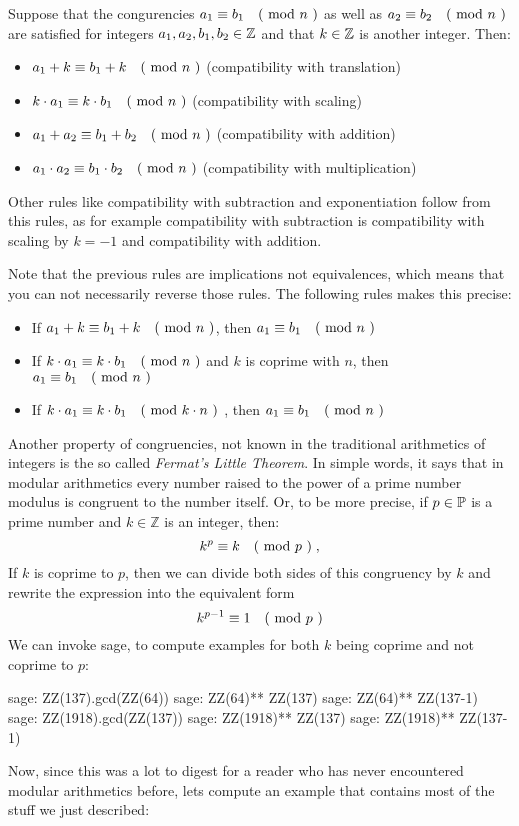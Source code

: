 Suppose that the congurencies $a_1 \equiv b_1 \quad \text{( mod } n \text{ )}$ as well as $a_2 \equiv b_2 \quad \text{( mod } n \text{ )}$ are satisfied for integers $a_1,a_2,b_1,b_2\in\mathbb{Z}$ and that $k\in\mathbb{Z}$ is another integer. Then:
\begin{itemize}
\item $a_1+k \equiv b_1+k \quad \text{( mod } n \text{ )}$ (compatibility with translation)
\item $k\cdot a_1 \equiv k\cdot b_1 \quad \text{( mod } n \text{ )}$ (compatibility with scaling)
\item $a_1+a_2 \equiv b_1+b_2 \quad \text{( mod } n \text{ )}$ (compatibility with addition)
\item $a_1\cdot a_2 \equiv b_1\cdot b_2 \quad \text{( mod } n \text{ )}$ (compatibility with multiplication)
\end{itemize}
Other rules like compatibility with subtraction and exponentiation follow from this rules, as for example compatibility with subtraction is compatibility with scaling by $k=-1$ and compatibility with addition.

Note that the previous rules are implications not equivalences, which means that you can not necessarily reverse those rules. The following rules makes this precise:
\begin{itemize}
\item If $a_1+k \equiv b_1+k \quad \text{( mod } n \text{ )}$, then $a_1 \equiv b_1 \quad \text{( mod } n \text{ )}$
\item If $k\cdot a_1 \equiv k\cdot b_1 \quad \text{( mod } n \text{ )}$ and $k$ is coprime with $n$, then $a_1 \equiv b_1 \quad \text{( mod } n \text{ )}$
\item If $k\cdot a_1 \equiv k\cdot b_1 \quad \text{( mod } k\cdot n \text{ )}$ , then $a_1 \equiv b_1 \quad \text{( mod } n \text{ )}$
\end{itemize}
Another property of congruencies, not known in the traditional arithmetics of integers is the so called \textit{Fermat's Little Theorem}. In simple words, it says that in modular arithmetics every number raised to the power of a prime number modulus is congruent to the number itself. Or, to be more precise, if $ p \in \mathbb{P} $ is a prime number and $ k \in \mathbb{Z} $ is an integer, then:
\begin{equation}
k ^ p \equiv k \quad \text{( mod } p \text{ )} \;,
\end{equation}
If $k$ is coprime to $p$, then we can divide both sides of this congruency by $k$ and rewrite the expression into the equivalent form 
\begin{equation}
\label{eq_fermat_lt_2}
k ^{p-1} \equiv 1 \quad \text{( mod } p \text{ )}
\end{equation} 
We can invoke sage, to compute examples for both $k$ being coprime and not coprime to $p$:
\begin{sagecommandline}
sage: ZZ(137).gcd(ZZ(64))
sage: ZZ(64)** ZZ(137) %
sage: ZZ(64)** ZZ(137-1) %
sage: ZZ(1918).gcd(ZZ(137))
sage: ZZ(1918)** ZZ(137) %
sage: ZZ(1918)** ZZ(137-1) %
\end{sagecommandline}
Now, since this was a lot to digest for a reader who has never encountered modular arithmetics before, lets compute an example that contains most of the stuff we just described:   
   
